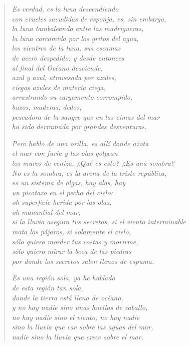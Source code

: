 \documentclass[12pt]{article}
\begin{document}
\begin{verse}
\emph{Es verdad, es la luna descendiendo\\
con crueles sacudidas de esponja, es, sin embargo,\\
la luna tambaleando entre las madrigueras,\\
la luna carcomida por los gritos del agua,\\
los vientres de la luna, sus escamas\\
de acero despedido: y desde entonces\\
al final del Océano desciende,\\
azul y azul, atravesada por azules,\\
ciegos azules de materia ciega,\\
arrastrando su cargamento corrompido,\\
buzos, maderas, dedos,\\
pescadora de la sangre que en las cimas del mar\\
ha sido derramada por grandes desventuras.}  

\emph{Pero hablo de una orilla, es allí donde azota\\
el mar con furia y las olas golpean\\
los muros de ceniza. ¿Qué es esto? ¿Es una sombra?\\
No es la sombra, es la arena de la triste república,\\
es un sistema de algas, hay alas, hay\\
un picotazo en el pecho del cielo:\\
oh superficie herida por las olas,\\
oh manantial del mar,\\
si la lluvia asegura tus secretos, si el viento interminable\\
mata los pájaros, si solamente el cielo,\\
sólo quiero morder tus costas y morirme,\\
sólo quiero mirar la boca de las piedras\\
por donde los secretos salen llenos de espuma.}  

\emph{Es una región sola, ya he hablado\\
de esta región tan sola,\\
donde la tierra está llena de océano,\\
y no hay nadie sino unas huellas de caballo,\\
no hay nadie sino el viento, no hay nadie\\
sino la lluvia que cae sobre las aguas del mar,\\
nadie sino la lluvia que crece sobre el mar.}  

\end{verse}
\end{document}
